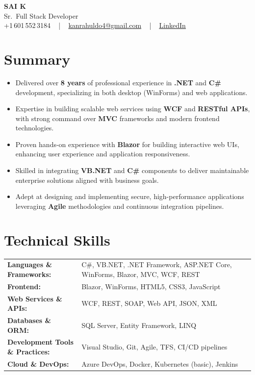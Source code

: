 \documentclass[letterpaper,11pt]{article}
\newcommand{\resumeItem}[1]{
  \item\footnotesize{
    {#1 \vspace{-2pt}}
  }
}
\newcommand{\resumeItemListStart}{\begin{itemize}[leftmargin=*]}
\newcommand{\resumeItemListEnd}{\end{itemize}\vspace{-5pt}}
\begin{document}
\begin{center}
    {\fontsize{14pt}{12pt}\selectfont \textbf{\MakeUppercase{Sai K}}}\\ \vspace{2pt}
    \fontsize{10pt}{12pt}\selectfont Sr.\ Full Stack Developer\\ \vspace{2pt}
    \fontsize{10pt}{12pt}\selectfont +1\,601\,552\,3184 ~ | ~
    \href{mailto:kanrahuldo4@gmail.com}{kanrahuldo4@gmail.com} ~ | ~
    \href{https://www.linkedin.com/in/srrrk/}{\color{blue}\underline{LinkedIn}}
    \vspace{-10pt}
\end{center}

\section{Summary}
\fontsize{9pt}{10pt}\selectfont
\resumeItemListStart
  \resumeItem{Delivered over \textbf{8 years} of professional experience in \textbf{.NET} and \textbf{C\#} development, specializing in both desktop (WinForms) and web applications.}
  \resumeItem{Expertise in building scalable web services using \textbf{WCF} and \textbf{RESTful APIs}, with strong command over \textbf{MVC} frameworks and modern frontend technologies.}
  \resumeItem{Proven hands-on experience with \textbf{Blazor} for building interactive web UIs, enhancing user experience and application responsiveness.}
  \resumeItem{Skilled in integrating \textbf{VB.NET} and \textbf{C\#} components to deliver maintainable enterprise solutions aligned with business goals.}
  \resumeItem{Adept at designing and implementing secure, high-performance applications leveraging \textbf{Agile} methodologies and continuous integration pipelines.}
\resumeItemListEnd
\vspace{-6pt}

\section{Technical Skills}
\vspace{-14pt}
\begin{table}[h]
\fontsize{9pt}{10pt}\selectfont
\begin{tabular}{p{0.3\linewidth} p{0.7\linewidth}}
\textbf{Languages \& Frameworks:} & C\#, VB.NET, .NET Framework, ASP.NET Core, WinForms, Blazor, MVC, WCF, REST \\
\textbf{Frontend:} & Blazor, WinForms, HTML5, CSS3, JavaScript \\
\textbf{Web Services \& APIs:} & WCF, REST, SOAP, Web API, JSON, XML \\
\textbf{Databases \& ORM:} & SQL Server, Entity Framework, LINQ \\
\textbf{Development Tools \& Practices:} & Visual Studio, Git, Agile, TFS, CI/CD pipelines \\
\textbf{Cloud \& DevOps:} & Azure DevOps, Docker, Kubernetes (basic), Jenkins \\
\end{tabular}
\end{table}
\vspace{-15pt}
\end{document}
